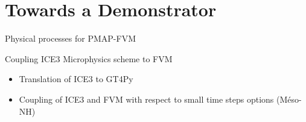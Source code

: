 \documentclass{beamer}
\begin{document}
    

\section{Towards a Demonstrator}

\begin{frame}{Physical processes for PMAP-FVM}

\begin{block}{Coupling ICE3 Microphysics scheme to FVM}
    \begin{itemize}
        \item \small Translation of ICE3 to GT4Py
        \item Coupling of ICE3 and FVM with respect to small time steps options (Méso-NH)
    \end{itemize}
\end{block}


\end{frame}
\end{document}
